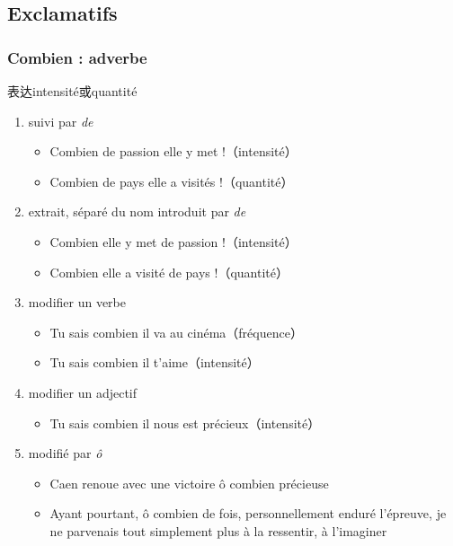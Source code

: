 \documentclass[UTF8]{report}
\begin{document}
\subsection{Exclamatifs}
\subsubsection{Combien : adverbe}
表达intensité或quantité
\begin{enumerate}
    \item suivi par \textit{de}
    \begin{itemize}
        \item Combien de passion elle y met !（intensité）
        \item Combien de pays elle a visités !（quantité）
    \end{itemize}
    \item extrait, séparé du nom introduit par \textit{de}
    \begin{itemize}
        \item Combien elle y met de passion !（intensité）
        \item Combien elle a visité de pays !（quantité）
    \end{itemize}
    \item modifier un verbe
    \begin{itemize}
        \item Tu sais combien il va au cinéma（fréquence）
        \item Tu sais combien il t’aime（intensité）
    \end{itemize}
    \item modifier un adjectif
    \begin{itemize}
        \item Tu sais combien il nous est précieux（intensité）
    \end{itemize}
    \item modifié par \textit{ô}
    \begin{itemize}
        \item Caen renoue avec une victoire ô combien précieuse
        \item Ayant pourtant, ô combien de fois, personnellement enduré l’épreuve, je ne parvenais tout simplement plus à la ressentir, à l’imaginer
    \end{itemize}
\end{enumerate}
\end{document}
